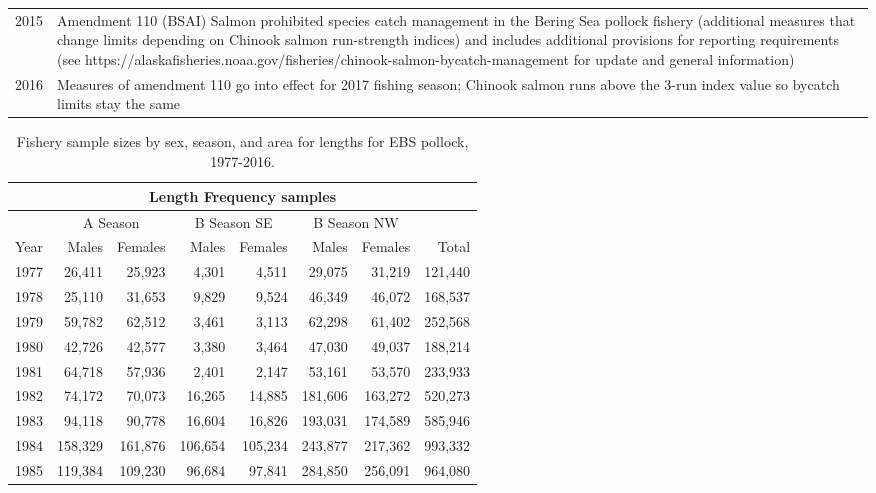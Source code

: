 \documentclass[]{article}
\begin{document}
\begin{table}[ht]
\begin{tabular}{p{0.5in}p{5.5in}}
2015    &   Amendment 110 (BSAI) Salmon prohibited species catch management in the Bering Sea pollock fishery (additional measures that change limits depending on Chinook salmon run-strength indices) and includes additional provisions for reporting requirements (see https://alaskafisheries.noaa.gov/fisheries/chinook-salmon-bycatch-management for update and general information) \\
2016    &   Measures of amendment 110 go into effect for 2017 fishing season; Chinook salmon runs above the 3-run index value so bycatch limits stay the same   \\
\hline
\end{tabular}
\end{table}

\begin{table}[ht]
\centering
\caption{Fishery sample sizes by sex, season, and area for lengths for EBS pollock, 1977-2016.}
\label{tab:samples}
\begin{tabular}{crrrrrrr}
\hline
\multicolumn{8}{c}{ Length Frequency samples } \\
\hline
        & \multicolumn{2}{c}{ A Season } &\multicolumn{2}{c}{B Season SE } &\multicolumn{2}{c}{B Season NW} &   \\
Year    &   Males   &   Females &   Males   &   Females &   Males   &   Females &   Total   \\
\hline
1977    &   26,411  &   25,923  &   4,301   &   4,511   &   29,075  &   31,219  &   121,440 \\
1978    &   25,110  &   31,653  &   9,829   &   9,524   &   46,349  &   46,072  &   168,537 \\
1979    &   59,782  &   62,512  &   3,461   &   3,113   &   62,298  &   61,402  &   252,568 \\
1980    &   42,726  &   42,577  &   3,380   &   3,464   &   47,030  &   49,037  &   188,214 \\
1981    &   64,718  &   57,936  &   2,401   &   2,147   &   53,161  &   53,570  &   233,933 \\
1982    &   74,172  &   70,073  &   16,265  &   14,885  &   181,606 &   163,272 &   520,273 \\
1983    &   94,118  &   90,778  &   16,604  &   16,826  &   193,031 &   174,589 &   585,946 \\
1984    &   158,329 &   161,876 &   106,654 &   105,234 &   243,877 &   217,362 &   993,332 \\
1985    &   119,384 &   109,230 &   96,684  &   97,841  &   284,850 &   256,091 &   964,080 \\

\end{tabular}
\end{table}
\end{document}
